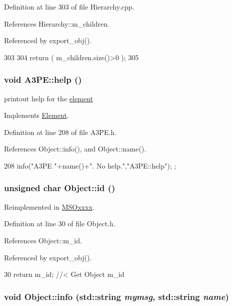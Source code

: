 Definition at line 303 of file Hierarchy.cpp.

References Hierarchy::m\_\-children.

Referenced by export\_\-obj().


\begin{DoxyCode}
303                               {
304   return ( m_children.size()>0 );
305 }
\end{DoxyCode}
\hypertarget{classA3PE_ae495a413cc26d31321b31942ebef1bfa}{
\subsubsection[{help}]{\setlength{\rightskip}{0pt plus 5cm}void A3PE::help ()}}
\label{classA3PE_ae495a413cc26d31321b31942ebef1bfa}
printout help for the \hyperlink{namespaceelement}{element} 

Implements \hyperlink{classElement_a32c0de27acb08e17251cef88c3e9303a}{Element}.

Definition at line 208 of file A3PE.h.

References Object::info(), and Object::name().


\begin{DoxyCode}
208 { info("A3PE "+name()+". No help.","A3PE::help"); };
\end{DoxyCode}
\hypertarget{classObject_af99145335cc61ff6e2798ea17db009d2}{
\subsubsection[{id}]{\setlength{\rightskip}{0pt plus 5cm}unsigned char Object::id ()}}
\label{classObject_af99145335cc61ff6e2798ea17db009d2}


Reimplemented in \hyperlink{classMSOxxxx_a0f14b23d31d8e7647184e99a89600cc3}{MSOxxxx}.

Definition at line 30 of file Object.h.

References Object::m\_\-id.

Referenced by export\_\-obj().


\begin{DoxyCode}
30 { return m_id;         } //< Get Object m_id 
\end{DoxyCode}
\hypertarget{classObject_a1ca123253dfd30fc28b156f521dcbdae}{
\subsubsection[{info}]{\setlength{\rightskip}{0pt plus 5cm}void Object::info (std::string {\em mymsg}, \/  std::string {\em name})}}
\label{classObject_a1ca123253dfd30fc28b156f521dcbdae}


